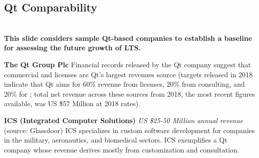 
\begin{frame}{}
\section{Qt Comparability}
\vspace{.5em}	

{\Large%
\hspace*{-2pt}\begin{minipage}{\textwidth}
\vspace{4pt}


		


{\hspace{1.5em}\begin{minipage}[l]{.9\textwidth}\Large\centering\color{slidePartHeadColor} 	
{}\\\vspace{1em}
{\LARGE \textbf{This slide considers sample Qt-based companies to establish a baseline for assessing 
	the future growth of LTS.}}
\vspace{.1em}	
\end{minipage}}
\vspace{.1em}

{\LARGE \setlength{\leftmargini}{30pt}\begin{enumerate}
\dmitem \textbf{The Qt Group Plc} 
Financial records released by the Qt company suggest that commercial 
 and  licenses 
are Qt's largest revenues source (targets 
released in 2018 indicate that Qt  
aims for 60\% revenue from licenses, 20\% from 
consulting, and 20\% for ; 
total net revenue across these sources from 2018, 
the most recent figures available, was 
US \$57 Million at 2018 rates).

\dmitem \textbf{ICS (Integrated Computer Solutions)} 
\textit{US \$25-50 Million annual revenue} (source: Glassdoor)
ICS specializes in custom software development 
for companies in the military, aeronautics, and 
biomedical sectors.  ICS exemplifies a 
Qt company whose revenue derives mostly from 
customization and consultation.


\end{enumerate}}
\end{minipage}}
\end{frame}
